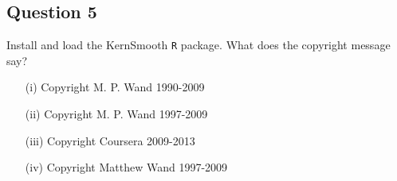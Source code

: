 \documentclass[]{article}
\begin{document}
\subsection*{Question 5}
Install and load the KernSmooth \texttt{R} package. What does the copyright message say?
\begin{itemize}
\item[(i)] Copyright M. P. Wand 1990-2009
\item[(ii)] Copyright M. P. Wand 1997-2009
\item[(iii)] Copyright Coursera 2009-2013
\item[(iv)] Copyright Matthew Wand 1997-2009
\end{itemize}

\newpage
\end{document}
